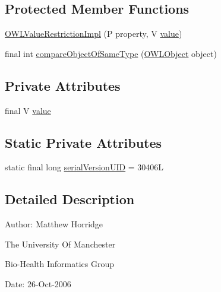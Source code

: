 \subsection*{Protected Member Functions}
\begin{DoxyCompactItemize}
\item 
\hyperlink{classuk_1_1ac_1_1manchester_1_1cs_1_1owl_1_1owlapi_1_1_o_w_l_value_restriction_impl_3_01_r_01extb41ab5275c9a4aea48395a608c721463_a453504e494a4848c68e6153f2b75f09b}{O\-W\-L\-Value\-Restriction\-Impl} (P property, V \hyperlink{classuk_1_1ac_1_1manchester_1_1cs_1_1owl_1_1owlapi_1_1_o_w_l_value_restriction_impl_3_01_r_01extb41ab5275c9a4aea48395a608c721463_a07e37263db5894eb37cac75ef9631619}{value})
\item 
final int \hyperlink{classuk_1_1ac_1_1manchester_1_1cs_1_1owl_1_1owlapi_1_1_o_w_l_value_restriction_impl_3_01_r_01extb41ab5275c9a4aea48395a608c721463_a3188b87f77622daefb55ba3af1c2d93c}{compare\-Object\-Of\-Same\-Type} (\hyperlink{interfaceorg_1_1semanticweb_1_1owlapi_1_1model_1_1_o_w_l_object}{O\-W\-L\-Object} object)
\end{DoxyCompactItemize}
\subsection*{Private Attributes}
\begin{DoxyCompactItemize}
\item 
final V \hyperlink{classuk_1_1ac_1_1manchester_1_1cs_1_1owl_1_1owlapi_1_1_o_w_l_value_restriction_impl_3_01_r_01extb41ab5275c9a4aea48395a608c721463_a07e37263db5894eb37cac75ef9631619}{value}
\end{DoxyCompactItemize}
\subsection*{Static Private Attributes}
\begin{DoxyCompactItemize}
\item 
static final long \hyperlink{classuk_1_1ac_1_1manchester_1_1cs_1_1owl_1_1owlapi_1_1_o_w_l_value_restriction_impl_3_01_r_01extb41ab5275c9a4aea48395a608c721463_abe419a82f95fadd3b63f3ef9edf44b1c}{serial\-Version\-U\-I\-D} = 30406\-L
\end{DoxyCompactItemize}


\subsection{Detailed Description}
Author\-: Matthew Horridge\par
 The University Of Manchester\par
 Bio-\/\-Health Informatics Group\par
 Date\-: 26-\/\-Oct-\/2006\par
\par
 
